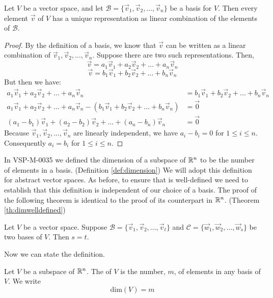 \documentclass{ximera}
\begin{document}
\begin{theorem}\label{th:uniquerep}
Let $V$ be a vector space, and let $\mathcal{B}=\{\vec{v}_1, \vec{v}_2,\ldots,\vec{v}_n\}$ be a basis for $V$.  Then every element $\vec{v}$ of $V$ has a unique representation as linear combination of the elements of $\mathcal{B}$.
\end{theorem}
\begin{proof}
By the definition of a basis, we know that $\vec{v}$ can be written as a linear combination of $\vec{v}_1, \vec{v}_2,\ldots,\vec{v}_n$.  Suppose there are two such representations.  Then,
$$\vec{v}=a_1\vec{v}_1+ a_2\vec{v}_2+\ldots+a_n\vec{v}_n$$
$$\vec{v}=b_1\vec{v}_1+ b_2\vec{v}_2+\ldots+b_n\vec{v}_n$$
But then we have:
\begin{align*}
a_1\vec{v}_1+ a_2\vec{v}_2+\ldots+a_n\vec{v}_n&=b_1\vec{v}_1+ b_2\vec{v}_2+\ldots+b_n\vec{v}_n\\
a_1\vec{v}_1+ a_2\vec{v}_2+\ldots+a_n\vec{v}_n-(b_1\vec{v}_1+ b_2\vec{v}_2+\ldots+b_n\vec{v}_n)&=\vec{0}\\
(a_1-b_1)\vec{v}_1+ (a_2-b_2)\vec{v}_2+\ldots+(a_n-b_n)\vec{v}_n&=\vec{0}
\end{align*}
Because $\vec{v}_1, \vec{v}_2,\ldots,\vec{v}_n$ are linearly independent, we have $a_i-b_i=0$ for $1\leq i\leq n$. Consequently $a_i=b_i$ for $1\leq i\leq n$.
\end{proof}

In VSP-M-0035 we defined the dimension of a subspace of $\mathbb{R}^n$ to be the number of elements in a basis. (Definition \ref{def:dimension})  We will adopt this definition for abstract vector spaces.  As before, to ensure that  is well-defined we need to establish that this definition is independent of our choice of a basis.  The proof of the following theorem is identical to the proof of its counterpart in $\mathbb{R}^n$.  (Theorem \ref{th:dimwelldefined})

\begin{theorem}\label{th:dimwelldefinedabstract}
Let $V$ be a vector space.  Suppose $\mathcal{B}=\{\vec{v}_1, \vec{v}_2,\ldots ,\vec{v}_t\}$ and $\mathcal{C}=\{\vec{w}_1, \vec{w}_2,\ldots ,\vec{w}_s\}$ be two bases of $V$.  Then $s=t$.
\end{theorem}
Now we can state the definition.
\begin{definition}\label{def:dimensionabstract}
Let $V$ be a subspace of $\mathbb{R}^n$.  The  of $V$ is the number, $m$, of elements in any basis of $V$.  We write
$$\mbox{dim}(V)=m$$
\end{definition}
\end{document}

